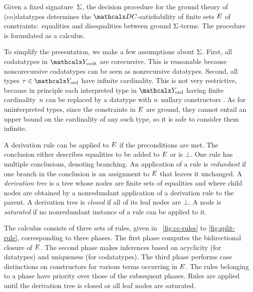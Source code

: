 Given a fixed signature~$\mathrm{\Sigma}$,
the decision procedure for the ground theory of (co)datatypes %
determines the
$\thD$-satisfiability of finite sets $E$ of constraints:\ equalities
and disequalities between ground $\mathrm{\Sigma}$-terms. The procedure is formulated as a
calculus.

To simplify the presentation, we make a few assumptions about
$\mathrm{\Sigma}$.
First, all codatatypes in $\Codata$ are corecursive. This is reasonable
because noncorecursive codatatypes can be seen as nonrecursive
datatypes.
Second, all types $\tau \in \Nondata$ have infinite cardinality.
This is not very restrictive, because in principle each interpreted type in
$\Nondata$ having finite cardinality~$n$
can be replaced by a %
datatype with $n$~nullary constructors
\cite{barrett-et-al-2007}.
As for uninterpreted types, since the constraints in $E$
are ground, they cannot entail an upper
bound on the cardinality of any such type, so it is safe to consider them infinite.


{
A derivation rule can be applied to $E$ if %
the %
preconditions are met.
The conclusion either describes equalities to be added to $E$
or is $\bot$. %
One rule has multiple conclusions, %
denoting branching.
%
An application of a rule is \emph{redundant} if one branch in the
conclusion is an assignment to $E$ that leaves it unchanged.
A \emph{derivation tree} is a %
tree whose nodes are finite sets of
equalities and where child nodes are obtained by a nonredundant application of a
derivation rule to the parent. A derivation tree is \emph{closed} if all of
its leaf nodes are $\bot$. A node is \emph{saturated} if no nonredundant
instance of a rule can be applied to it.

}

The calculus consists of three sets of rules, given in
\figuresname~\ref{fig:cc-rules} to \ref{fig:split-rule}, corresponding to three
phases. The first phase computes the bidirectional closure of $E$. The second
phase makes inferences based on acyclicity (for datatypes) and uniqueness
(for codatatypes).
The third phase performs case distinctions on constructors for
various terms occurring in $E$.
%
The rules belonging to a phase have priority over those of the subsequent
phases. Rules are applied until the derivation tree is closed or all leaf nodes
are saturated.

